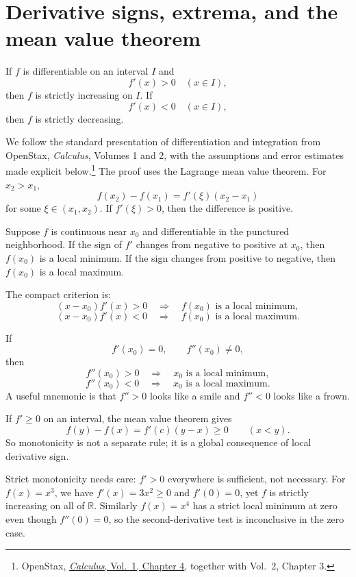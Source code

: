 
\section{Derivative signs, extrema, and the mean value theorem}

If $f$ is differentiable on an interval $I$ and
\[
  f'(x)>0\quad(x\in I),
\]
then $f$ is strictly increasing on $I$.  If
\[
  f'(x)<0\quad(x\in I),
\]
then $f$ is strictly decreasing.

We follow the standard presentation of differentiation and integration from OpenStax, \emph{Calculus}, Volumes 1 and 2, with the assumptions and error estimates made explicit below.\footnote{OpenStax, \href{https://openstax.org/books/calculus-volume-1/pages/4-introduction}{\emph{Calculus}, Vol.~1, Chapter 4}, together with Vol.~2, Chapter 3.} The proof uses the Lagrange mean value theorem.  For $x_2>x_1$,
\[
  f(x_2)-f(x_1)=f'(\xi)(x_2-x_1)
\]
for some $\xi\in(x_1,x_2)$.  If $f'(\xi)>0$, then the difference is positive.

Suppose $f$ is continuous near $x_0$ and differentiable in the punctured neighborhood.  If the sign of $f'$ changes from negative to positive at $x_0$, then $f(x_0)$ is a local minimum.  If the sign changes from positive to negative, then $f(x_0)$ is a local maximum.

The compact criterion is:
\[
  (x-x_0)f'(x)>0
  \quad\Longrightarrow\quad
  f(x_0)\text{ is a local minimum},
\]
\[
  (x-x_0)f'(x)<0
  \quad\Longrightarrow\quad
  f(x_0)\text{ is a local maximum}.
\]

If
\[
  f'(x_0)=0,\qquad f''(x_0)\ne0,
\]
then
\[
  f''(x_0)>0\quad\Longrightarrow\quad x_0\text{ is a local minimum},
\]
\[
  f''(x_0)<0\quad\Longrightarrow\quad x_0\text{ is a local maximum}.
\]
A useful mnemonic is that $f''>0$ looks like a smile and $f''<0$ looks like a frown.

If \(f'\ge0\) on an interval, the mean value theorem gives
\[
  f(y)-f(x)=f'(c)(y-x)\ge0\qquad (x<y).
\]
So monotonicity is not a separate rule; it is a global consequence of local derivative sign.

Strict monotonicity needs care: \(f'>0\) everywhere is sufficient, not necessary. For \(f(x)=x^3\), we have \(f'(x)=3x^2\ge0\) and \(f'(0)=0\), yet \(f\) is strictly increasing on all of \(\mathbb R\). Similarly \(f(x)=x^4\) has a strict local minimum at zero even though \(f''(0)=0\), so the second-derivative test is inconclusive in the zero case.

